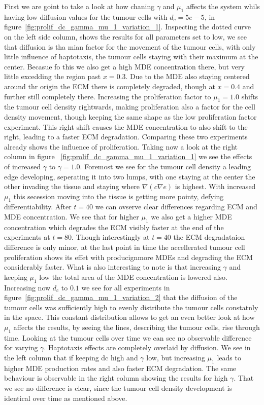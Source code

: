 First we are goint to take a look at how chaning $\gamma$ and $\mu_1$ affects the system whils having low diffusion values for the tumour cells with $d_c=5e-5$, in figure~\ref{fig:prolif_dc_gamma_mu_1_variation_1}. Inspecting the dotted curve on the left side column, shows the results for all parameters set to low, we see that diffusion is tha mian factor for the movement of the tumour cells, with only little influence of haptotaxis, the tumour cells staying with their maximum at the center. Becasue fo this we also get a high MDE concentration there, but very little excedding the region past $x=0.3$. Due to the MDE also staying centered around thr origin the ECM there is completely degraded, though at $x=0.4$ and further still completely there. Increasing the proliferation factor to $\mu_1=1.0$ shifts the tumour cell density rightwards, making proliferation also a factor for the cell density movement, though keeping the same shape as the low proliferation factor experiment. This right shift causes the MDE concentration to also shift to the right, leading to a faster ECM degradation. Comparing these two experiments already shows the influence of proliferation.\newline
Taking now a look at the right column in figure ~\ref{fig:prolif_dc_gamma_mu_1_variation_1} we see the effects of increased $\gamma$ to $\gamma=1.0$. Foremost we see for the tumour cell density a leading edge developing, seperating it into two lumps, with one staying at the center the other invading the tissue and staying where $\nabla (c \nabla e)$ is highest. With increased $\mu_1$ this secession moving into the tissue is getting more pointy, defying differentiability. After $t=40$ we can ovserve clear differences regarding ECM and MDE concentration. We see that for higher $\mu_1$ we also get a higher MDE concentration which degrades the ECM visibly faster at the end of the experiments at $t=80$. Though interestingly at $t=40$ the ECM degradataion difference is only minor, at the last point in time the accellerated tumour cell proliferation shows its effet with producignmore MDEs and degrading the ECM considerably faster. What is also interesting to note is that increasing $\gamma$ and keeping $\mu_1$ low the total area of the MDE concentration is lowered also.
Increasing now $d_c$ to $0.1$ we see for all experiments in figure~\ref{fig:prolif_dc_gamma_mu_1_variation_2} that the diffusion of the tumour cells was sufficiently high to evenly distribute the tumour cells constatnly in the space. This constant distribution allows to get an even better look at how $\mu_1$ affects the results, by seeing the lines, describing the tumour cells, rise through time. Looking at the tumour cells over time we can see no observable difference for varying $\gamma$. Haptotaxis effects are completely overlaid by diffusion. We see in the left column that if keeping dc high and $\gamma$ low, but increasing $\mu_1$ leads to higher MDE production rates and also faster ECM degradation. The same behaviour is observable in the right column showing the results for high $\gamma$. That we see no difference is clear, since the tumour cell density development is identical over time as mentioned above. 



